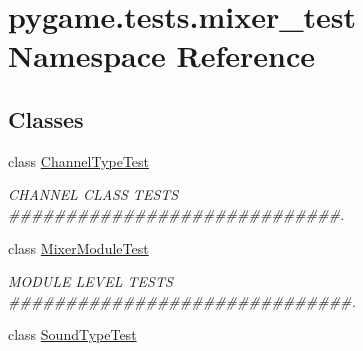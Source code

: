 \hypertarget{namespacepygame_1_1tests_1_1mixer__test}{}\section{pygame.\+tests.\+mixer\+\_\+test Namespace Reference}
\label{namespacepygame_1_1tests_1_1mixer__test}
\subsection*{Classes}
\begin{DoxyCompactItemize}
\item 
class \hyperlink{classpygame_1_1tests_1_1mixer__test_1_1_channel_type_test}{Channel\+Type\+Test}
\begin{DoxyCompactList}\small\item\em C\+H\+A\+N\+N\+EL C\+L\+A\+SS T\+E\+S\+TS \#\#\#\#\#\#\#\#\#\#\#\#\#\#\#\#\#\#\#\#\#\#\#\#\#\#\#\#\#. \end{DoxyCompactList}\item 
class \hyperlink{classpygame_1_1tests_1_1mixer__test_1_1_mixer_module_test}{Mixer\+Module\+Test}
\begin{DoxyCompactList}\small\item\em M\+O\+D\+U\+LE L\+E\+V\+EL T\+E\+S\+TS \#\#\#\#\#\#\#\#\#\#\#\#\#\#\#\#\#\#\#\#\#\#\#\#\#\#\#\#\#\#. \end{DoxyCompactList}\item 
class \hyperlink{classpygame_1_1tests_1_1mixer__test_1_1_sound_type_test}{Sound\+Type\+Test}
\end{DoxyCompactItemize}

